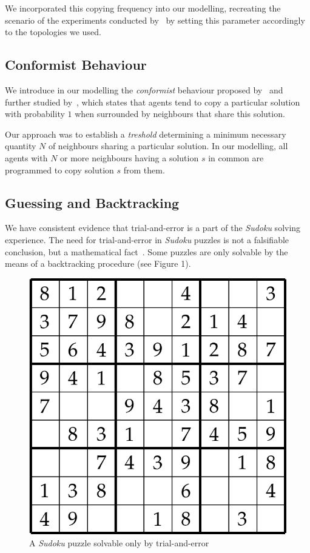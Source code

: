 \documentclass[letterpaper]{article}
\begin{document}
We incorporated this copying frequency into our modelling, recreating the scenario of the experiments conducted by~\cite{farenzena:collabem} by setting this parameter accordingly to the topologies we used.

\subsection{Conformist Behaviour}

We introduce in our modelling the {\em conformist} behaviour proposed by~\cite{cefferson:conformists} and further studied by~\cite{farenzena:collabem}, which states that agents tend to copy a particular solution with probability $1$ when surrounded by neighbours that share this solution. 

Our approach was to establish a {\em treshold} determining a minimum necessary quantity $N$ of neighbours sharing a particular solution. In our modelling, all agents with $N$ or more neighbours having a solution $s$ in common are programmed to copy solution $s$ from them.

\subsection{Guessing and Backtracking}

We have consistent evidence that trial-and-error is a part of the {\em Sudoku} solving experience. The need for trial-and-error in {\em Sudoku} puzzles is not a falsifiable conclusion, but a mathematical fact~\cite{davis:mathsudoku}. Some puzzles are only solvable by the means of a backtracking procedure (see Figure 1).

\begin{figure}
\centering
\includegraphics[scale=0.30]{trial_and_error_sudoku}
\caption{A {\em Sudoku} puzzle solvable only by trial-and-error}
\label{fig:trial_and_error_sudoku}
\end{figure}
\end{document}
